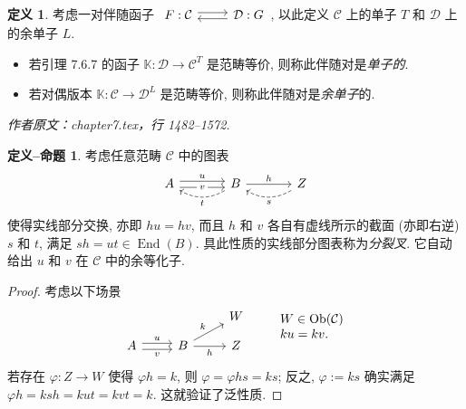 \documentclass[11pt]{article}
\newcommand{\Obj}{\operatorname{Ob}}
\newcommand{\End}{\operatorname{End}}
\renewcommand{\index}[2][]{\relax}
\newcommand{\CorpusNumber}{0}
\theoremstyle{definition}
\newtheorem{definition}[theorem]{定义}
\newtheorem{definition-proposition}[theorem]{定义--命题}
\begin{document}
\def\CorpusNumber{7.6.8}
\begin{definition}\label{def:monadic}
	考虑一对伴随函子
	$\begin{tikzcd}
		F: \mathcal{C} \arrow[shift left, r] & \mathcal{D}: G \arrow[shift left, l]
	\end{tikzcd}$,
	以此定义 $\mathcal{C}$ 上的单子 $T$ 和 $\mathcal{D}$ 上的余单子 $L$.
	\begin{itemize}
		\item 若引理 7.6.7 的函子 $\mathbb{K}: \mathcal{D} \to \mathcal{C}^T$ 是范畴等价, 则称此伴随对是\emph{单子的}.
		\item 若对偶版本 $\mathbb{K}: \mathcal{C} \to \mathcal{D}^L$ 是范畴等价, 则称此伴随对是\emph{余单子}的.
	\end{itemize}
\end{definition}
\par\medskip\noindent\textit{作者原文：chapter7.tex，行 1482--1572.}\par
\def\CorpusNumber{7.6.9}
\begin{definition-proposition}
	\index{fenliecha@分裂叉 (split fork)}
	考虑任意范畴 $\mathcal{C}$ 中的图表
	\begin{equation*}\label{eqn:split-coeq}\begin{tikzcd}[column sep=large]
		A \arrow[shift left, r, "u"] \arrow[shift right, r, "v" description] & B \arrow[r, "h"] \arrow[dashed, l, bend left, "t"] & Z \arrow[dashed, l, bend left, "s"]
	\end{tikzcd}\end{equation*}
	使得实线部分交换, 亦即 $hu = hv$, 而且 $h$ 和 $v$ 各自有虚线所示的截面 (亦即右逆) $s$ 和 $t$, 满足 $sh = ut \in \End(B)$. 具此性质的实线部分图表称为\emph{分裂叉}. 它自动给出 $u$ 和 $v$ 在 $\mathcal{C}$ 中的余等化子.
\end{definition-proposition}
\begin{proof}
	考虑以下场景
	\[\begin{tikzcd}[row sep=small]
		& & W \\
		A \arrow[shift left, r, "u"] \arrow[shift right, r, "v"'] & B \arrow[r, "h"'] \arrow[ru, "k"] & Z
	\end{tikzcd} \qquad \begin{array}{ll}
		W \in \Obj(\mathcal{C}) \\
		ku = kv.
	\end{array} \]
	若存在 $\varphi: Z \to W$ 使得 $\varphi h = k$, 则 $\varphi = \varphi hs = ks$; 反之, $\varphi := ks$ 确实满足 $\varphi h = ksh = kut = kvt = k$. 这就验证了泛性质.
\end{proof}
\end{document}
